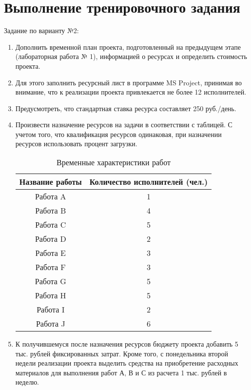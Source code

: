 \section{Выполнение тренировочного задания}

Задание по варианту №2:

\begin{enumerate}
    \item Дополнить временной план проекта, подготовленный на предыдущем этапе
    (лабораторная работа № 1), информацией о ресурсах и определить стоимость
    проекта.

    \item Для этого заполнить ресурсный лист в программе MS Project, принимая во
    внимание, что к реализации проекта привлекается не более 12 исполнителей. 

    \item Предусмотреть, что стандартная ставка ресурса составляет 250 руб./день.

    \item Произвести назначение ресурсов на задачи в соответствии с таблицей. С
    учетом того, что квалификация ресурсов одинаковая, при назначении ресурсов
    использовать процент загрузки. 

    {
    \captionsetup{format=hang,justification=raggedleft,
                  singlelinecheck=off,width=17cm}
    \begin{longtable}[Hc]{|c|c|}
    \caption{Временные характеристики работ}\\
        \hline
        Название работы & Количество исполнителей (чел.)\\
        \hline
        Работа A & 1\\
        \hline
        Работа B & 4\\
        \hline
        Работа C & 5\\
        \hline
        Работа D & 2\\
        \hline
        Работа E & 3\\
        \hline
        Работа F & 3\\
        \hline
        Работа G & 5\\
        \hline
        Работа H & 5\\
        \hline
        Работа I & 2\\
        \hline
        Работа J & 6\\
        \hline
    \end{longtable}
    }

    \item К получившемуся после назначения ресурсов бюджету проекта добавить 5
    тыс.  рублей фиксированных затрат. Кроме того, с понедельника второй недели
    реализации проекта выделить средства на приобретение расходных материалов для
    выполнения работ А, В и С из расчета 1 тыс. рублей в неделю.
\end{enumerate}

